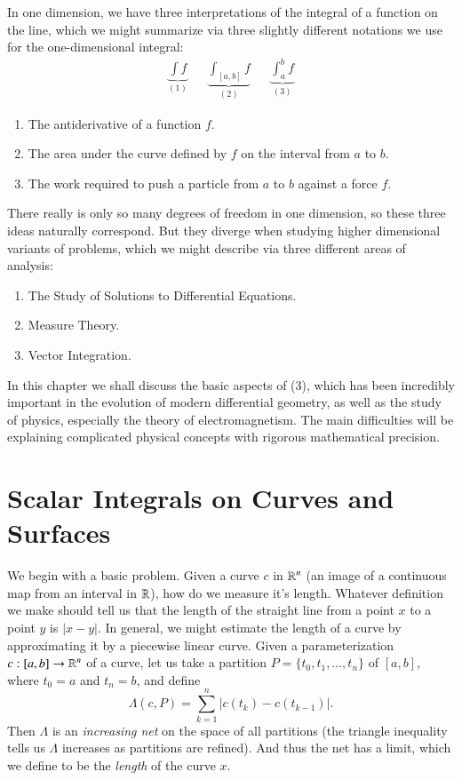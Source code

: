 In one dimension, we have three interpretations of the integral of a function on the line, which we might summarize via three slightly different notations we use for the one-dimensional integral:
%
\begin{align*}
    \underbrace{\int f}_{(1)} && \underbrace{{\int_{[a,b]} f}}_{(2)} && \underbrace{\int_a^b f}_{(3)}
\end{align*}
%
\begin{enumerate}
    \item The antiderivative of a function $f$.
    \item The area under the curve defined by $f$ on the interval from $a$ to $b$.
    \item The work required to push a particle from $a$ to $b$ against a force $f$.
\end{enumerate}
%
There really is only so many degrees of freedom in one dimension, so these three ideas naturally correspond. But they diverge when studying higher dimensional variants of problems, which we might describe via three different areas of analysis:
%
\begin{enumerate}
    \item The Study of Solutions to Differential Equations.
    \item Measure Theory.
    \item Vector Integration.
\end{enumerate}
%
In this chapter we shall discuss the basic aspects of (3), which has been incredibly important in the evolution of modern differential geometry, as well as the study of physics, especially the theory of electromagnetism. The main difficulties will be explaining complicated physical concepts with rigorous mathematical precision.





\section{Scalar Integrals on Curves and Surfaces}

We begin with a basic problem. Given a curve $c$ in $\operatorname{\mathbb{R}}^n$ (an image of a continuous map from an interval in $\operatorname{\mathbb{R}}$), how do we measure it's length. Whatever definition we make should tell us that the length of the straight line from a point $x$ to a point $y$ is $|x - y|$. In general, we might estimate the length of a curve by approximating it by a piecewise linear curve. Given a parameterization $c: [a,b] \to \operatorname{\mathbb{R}}^n$ of a curve, let us take a partition $P = \{ t_0, t_1, \dots, t_n \}$ of $[a,b]$, where $t_0 = a$ and $t_n = b$, and define
%
\[ \Lambda(c,P) = \sum_{k = 1}^n |c(t_k) - c(t_{k-1})|. \]
%
Then $\Lambda$ is an \emph{increasing net} on the space of all partitions (the triangle inequality tells us $\Lambda$ increases as partitions are refined). And thus the net has a limit, which we define to be the \emph{length} of the curve $x$.

